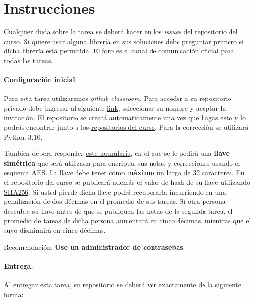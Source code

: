 
\section*{Instrucciones}

Cualquier duda sobre la tarea se deberá hacer en los \emph{issues} del \href{https://github.com/IIC3253/2023}{repositorio del curso}. Si quiere usar alguna librería en sus soluciones debe preguntar primero si dicha librería está permitida. El foro es el canal de comunicación oficial para todas las tareas.

\paragraph{Configuración inicial.} 
Para esta tarea utilizaremos \textit{github classroom}. 
Para acceder a su repositorio privado debe ingresar al siguiente \href{https://classroom.github.com/a/4ie2AjuF}{link}, seleccionar su nombre y aceptar la invitación.
El repositorio se creará automaticamente una vez que hagas esto y lo podrás encontrar junto a los \href{https://github.com/orgs/IIC3253/repositories}{repositorios del curso}.
Para la corrección se utilizará Python 3.10.

\bigskip

También deberá responder \href{https://forms.gle/1KRanAJxcusURsUx8}{este formulario}, en el que se le pedirá una \textbf{llave simétrica} que será utilizada para encriptar sus notas y correcciones usando el esquema \href{https://en.wikipedia.org/wiki/Advanced_Encryption_Standard}{AES}.
La llave debe tener como \textbf{máximo} un largo de 32 caracteres.
En el repositorio del curso se publicará además el valor de hash de su llave utilizando \href{https://en.wikipedia.org/wiki/SHA-2}{SHA256}. 
Si usted pierde dicha llave podrá recuperarla incurriendo en una penalización de dos décimas en el promedio de sus tareas. 
Si otra persona descubre su llave antes de que se publiquen las notas de la segunda tarea, el promedio de tareas de dicha persona aumentará en cinco décimas, mientras que el suyo disminuirá en cinco décimas. 

Recomendación: \textbf{Use un administrador de contraseñas}.


\newpage
\paragraph{Entrega.} Al entregar esta tarea, su repositorio se deberá ver exactamente de la siguiente forma:

